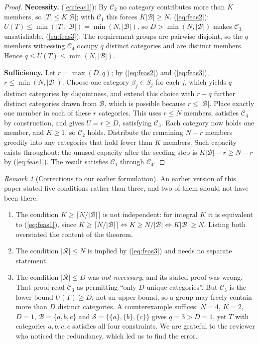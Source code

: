 \documentclass[11pt,a4paper]{article}
\theoremstyle{plain}
\theoremstyle{definition}
\theoremstyle{remark}
\newtheorem{remark}[theorem]{Remark}
\begin{document}
\begin{proof}
\textbf{Necessity.}
(\ref{eq:feas1}): By $\mathcal{C}_2$ no category contributes more than $K$ members, so $|T| \leq K|\mathcal{B}|$; with $\mathcal{C}_1$ this forces $K|\mathcal{B}| \geq N$.
(\ref{eq:feas2}): $U(T) \leq \min(|T|, |\mathcal{B}|) = \min(N, |\mathcal{B}|)$, so $D > \min(N,|\mathcal{B}|)$ makes $\mathcal{C}_3$ unsatisfiable.
(\ref{eq:feas3}): The requirement groups are pairwise disjoint, so the $q$ members witnessing $\mathcal{C}_4$ occupy $q$ distinct categories and are distinct members. Hence $q \leq U(T) \leq \min(N, |\mathcal{B}|)$.

\textbf{Sufficiency.} Let $r = \max(D, q)$; by (\ref{eq:feas2}) and (\ref{eq:feas3}), $r \leq \min(N, |\mathcal{B}|)$. Choose one category $\beta_j \in S_j$ for each $j$, which yields $q$ distinct categories by disjointness, and extend this choice with $r - q$ further distinct categories drawn from $\mathcal{B}$, which is possible because $r \leq |\mathcal{B}|$. Place exactly one member in each of these $r$ categories. This uses $r \leq N$ members, satisfies $\mathcal{C}_4$ by construction, and gives $U = r \geq D$, satisfying $\mathcal{C}_3$. Each category now holds one member, and $K \geq 1$, so $\mathcal{C}_2$ holds. Distribute the remaining $N - r$ members greedily into any categories that hold fewer than $K$ members. Such capacity exists throughout: the unused capacity after the seeding step is $K|\mathcal{B}| - r \geq N - r$ by (\ref{eq:feas1}). The result satisfies $\mathcal{C}_1$ through $\mathcal{C}_4$.
\end{proof}

\begin{remark}[Corrections to our earlier formulation]
\label{rem:corrections}
An earlier version of this paper stated five conditions rather than three, and two of them should not have been there.
\begin{enumerate}[noitemsep,topsep=3pt]
    \item The condition $K \geq \lceil N/|\mathcal{B}| \rceil$ is not independent: for integral $K$ it is equivalent to (\ref{eq:feas1}), since $K \geq \lceil N/|\mathcal{B}| \rceil \iff K \geq N/|\mathcal{B}| \iff K|\mathcal{B}| \geq N$. Listing both overstated the content of the theorem.
    \item The condition $|\mathcal{R}| \leq N$ is implied by (\ref{eq:feas3}) and needs no separate statement.
    \item The condition $|\mathcal{R}| \leq D$ was \emph{not necessary}, and its stated proof was wrong. That proof read $\mathcal{C}_3$ as permitting ``only $D$ unique categories''. But $\mathcal{C}_3$ is the lower bound $U(T) \geq D$, not an upper bound, so a group may freely contain more than $D$ distinct categories. A counterexample suffices: $N = 4$, $K = 2$, $D = 1$, $\mathcal{B} = \{a,b,c\}$ and $\mathcal{S} = \{\{a\},\{b\},\{c\}\}$ gives $q = 3 > D = 1$, yet $T$ with categories $a,b,c,c$ satisfies all four constraints. We are grateful to the reviewer who noticed the redundancy, which led us to find the error.
\end{enumerate}
\end{remark}
\end{document}
